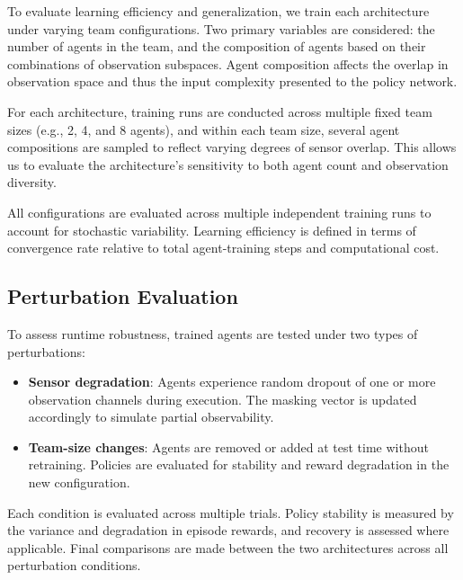 \documentclass{article}
\begin{document}
To evaluate learning efficiency and generalization, 
we train each architecture under varying team configurations. 
Two primary variables are considered: the number of agents in the team, 
and the composition of agents based on their combinations of observation subspaces. 
Agent composition affects the overlap in observation space and thus 
the input complexity presented to the policy network. 

For each architecture, training runs are conducted across multiple 
fixed team sizes (e.g., 2, 4, and 8 agents), and within each team size, 
several agent compositions are sampled to reflect varying degrees of sensor overlap. 
This allows us to evaluate the architecture's sensitivity to 
both agent count and observation diversity.

All configurations are evaluated across multiple independent 
training runs to account for stochastic variability.
Learning efficiency is defined in terms of convergence rate 
relative to total agent-training steps and computational cost.

\subsection{Perturbation Evaluation}

To assess runtime robustness, trained agents are tested under two types of perturbations:

\begin{itemize}
    \item \textbf{Sensor degradation}: Agents experience random dropout 
        of one or more observation channels during execution. 
        The masking vector is updated accordingly to simulate partial observability.
    \item \textbf{Team-size changes}: Agents are removed or added at test 
        time without retraining. Policies are evaluated for stability and 
        reward degradation in the new configuration.
\end{itemize}

Each condition is evaluated across multiple trials. 
Policy stability is measured by the variance and degradation in episode rewards, 
and recovery is assessed where applicable. 
Final comparisons are made between the two architectures across all perturbation conditions.



\printbibliography
\end{document}
